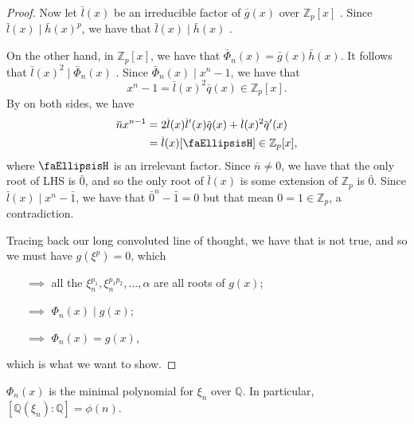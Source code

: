 \documentclass[notoc,notitlepage,nobib]{tufte-book}
\begin{document}
\begin{proof}
  Now let $\bar{l}(x)$ be an irreducible factor of $\bar{g}(x)$ over $\mathbb{Z}_p[x]$
  . Since $\bar{l}(x) \mid \bar{h}(x)^p$, we
  have that $\bar{l}(x) \mid \bar{h}(x)$ . %

  On the other hand, in $\mathbb{Z}_p[x]$, we have that $\bar{\Phi}_n(x) = \bar{g}(x)
  \bar{h}(x)$. It follows that $\bar{l}(x)^2 \mid \bar{\Phi}_n(x)$
  . %
  Since $\bar{\Phi}_n(x) \mid x^n - 1$, we have that
  \begin{equation*}
    x^n - 1 = \bar{l}(x)^2 \bar{q}(x) \in \mathbb{Z}_p[x].
  \end{equation*}
  By  on both sides, we have
  \begin{align*}
    \bar{n} x^{n - 1} &= 2 \bar{l}(x) \bar{l}'(x) \bar{q}(x) + \bar{l}(x)^2 \bar{q}'(x) \\
                      &= \bar{l}(x) [ \faEllipsisH ] \in \mathbb{Z}_p[x],
  \end{align*}
  where $\faEllipsisH$ is an irrelevant factor. Since $\bar{n} \neq 0$, we have that the
  only root of LHS is $\bar{0}$, and so the only root of $\bar{l}(x)$ is some extension of
  $\mathbb{Z}_p$ is $\bar{0}$. Since $\bar{l}(x) \mid x^n - \bar{1}$, we have that
  $\bar{0}^n - \bar{1} = 0$ but that mean $0 = 1 \in \mathbb{Z}_p$, a contradiction.

  Tracing back our long convoluted line of thought, we have that \faDizzy is not true, and
  so we must have $g(\xi^p) = 0$, which
  \begin{itemize}
    \item[$\implies$] all the $\xi_n^{p_1}, \xi_n^{p_1 p_2}, \ldots, \alpha$ are all roots
      of $g(x)$;
    \item[$\implies$] $\Phi_n(x) \mid g(x)$;
    \item[$\implies$] $\Phi_n(x) = g(x)$,
  \end{itemize}
  which is what we want to show.
\end{proof}

\begin{crly}\label{crly:cyclotomic_polynomials_are_minimal_polynomials_of_its_roots_over_q_}
  $\Phi_n(x)$ is the minimal polynomial for $\xi_n$ over $\mathbb{Q}$. In particular, $[
  \mathbb{Q}(\xi_n) : \mathbb{Q} ] = \phi(n)$.
\end{crly}
\end{document}
